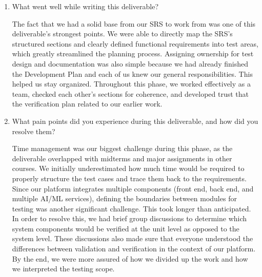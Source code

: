 \documentclass[12pt, titlepage]{article}
\begin{document}
\begin{enumerate}
  \item What went well while writing this deliverable? 
  
  \hspace{2em} The fact that we had a solid base from our SRS to work from was one of this deliverable's strongest points. We were able to directly map the SRS's structured sections and clearly defined functional requirements into test areas, which greatly streamlined the planning process. Assigning ownership for test design and documentation was also simple because we had already finished the Development Plan and each of us knew our general responsibilities. This helped us stay organized. Throughout this phase, we worked effectively as a team, checked each other's sections for coherence, and developed trust that the verification plan related to our earlier work.

  \item What pain points did you experience during this deliverable, and how
    did you resolve them?

  \hspace{2em} Time management was our biggest challenge during this phase, as the deliverable overlapped with midterms and major assignments in other courses. We initially underestimated how much time would be required to properly structure the test cases and trace them back to the requirements. Since our platform integrates multiple components (front end, back end, and multiple AI/ML services), defining the boundaries between modules for testing was another significant challenge. This took longer than anticipated. In order to resolve this, we had brief group discussions to determine which system components would be verified at the unit level as opposed to the system level. These discussions also made sure that everyone understood the differences between validation and verification in the context of our platform. By the end, we were more assured of how we divided up the work and how we interpreted the testing scope.


\end{enumerate}
\end{document}

